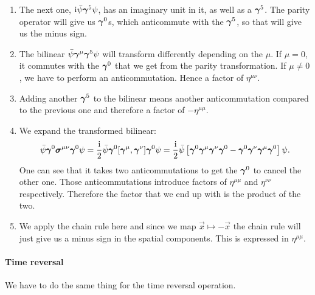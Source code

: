 \documentclass[11pt, english, fleqn, DIV=15, headinclude, BCOR=1cm]{scrartcl}
\begin{document}
\begin{enumerate}
    \item
        The next one, $\iup \bar\psi \mat\gamma^5 \psi$, has an imaginary unit
        in it, as well as a $\mat\gamma^5$. The parity operator will give us
        $\mat\gamma^0$s, which anticommute with the $\mat\gamma^5$, so that
        will give us the minus sign.

    \item
        The bilinear $\bar\psi \mat\gamma^\mu \mat\gamma^5 \psi$ will transform
        differently depending on the $\mu$. If $\mu = 0$, it commutes with the
        $\mat\gamma^0$ that we get from the parity transformation. If $\mu \neq
        0$, we have to perform an anticommutation. Hence a factor of
        $\eta^{\mu\nu}$.

    \item
        Adding another $\mat\gamma^5$ to the bilinear means another
        anticommutation compared to the previous one and therefore a factor of
        $- \eta^{\mu\mu}$.

    \item
        We expand the transformed bilinear:
        \[
            \bar\psi \mat\gamma^0 \mat\sigma^{\mu\nu} \mat\gamma^0 \psi
            = \frac\iup2 \bar\psi \mat\gamma^0 [\mat\gamma^\mu, \mat\gamma^\nu] \mat\gamma^0 \psi
            = \frac\iup2 \bar\psi \sbr{
                \mat\gamma^0 \mat\gamma^\mu \mat\gamma^\nu \mat\gamma^0
                - \mat\gamma^0 \mat\gamma^\nu \mat\gamma^\mu \mat\gamma^0
        } \psi.
        \]
        One can see that it takes two anticommutations to get the
        $\mat\gamma^0$ to cancel the other one. Those anticommutations
        introduce factors of $\eta^{\mu\mu}$ and $\eta^{\nu\nu}$ respectively.
        Therefore the factor that we end up with is the product of the two.

    \item
        We apply the chain rule here and since we map $\vec x \mapsto - \vec x$
        the chain rule will just give us a minus sign in the spatial
        components. This is expressed in $\eta^{\mu\mu}$.
\end{enumerate}

\paragraph{Time reversal}

We have to do the same thing for the time reversal operation.
\end{document}
